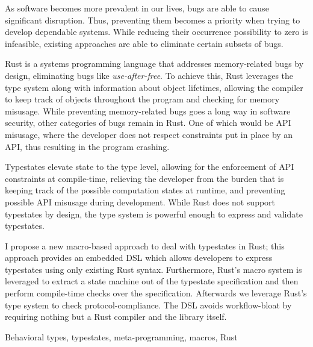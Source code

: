 

As software becomes more prevalent in our lives, bugs are able to cause significant disruption.
Thus, preventing them becomes a priority when trying to develop dependable systems.
While reducing their occurrence possibility to zero is infeasible,
existing approaches are able to eliminate certain subsets of bugs.

Rust is a systems programming language that addresses memory-related bugs by design,
eliminating bugs like \emph{use-after-free}.
To achieve this, Rust leverages the type system along with information about object lifetimes,
allowing the compiler to keep track of objects throughout the program and checking for memory misusage.
While preventing memory-related bugs goes a long way in software security, other categories of bugs remain in Rust.
One of which would be \gls{API} misusage, where the developer does not respect constraints put in place by an \gls{API},
thus resulting in the program crashing.

Typestates elevate state to the type level, allowing for the enforcement of \gls{API} constraints at compile-time,
relieving the developer from the burden that is keeping track of the possible computation states at runtime,
and preventing possible \gls{API} misusage during development.
While Rust does not support typestates by design,
the type system is powerful enough to express and validate typestates.

I propose a new macro-based approach to deal with typestates in Rust;
this approach provides an embedded \gls{DSL} which allows developers to express typestates using only existing Rust syntax.
Furthermore, Rust's macro system is leveraged to extract a state machine out of the typestate specification and
then perform compile-time checks over the specification.
Afterwards we leverage Rust's type system to check protocol-compliance.
The \gls{DSL} avoids workflow-bloat by requiring nothing but a Rust compiler and the library itself.


\begin{keywords}
Behavioral types, typestates, meta-programming, macros, Rust
\end{keywords}
